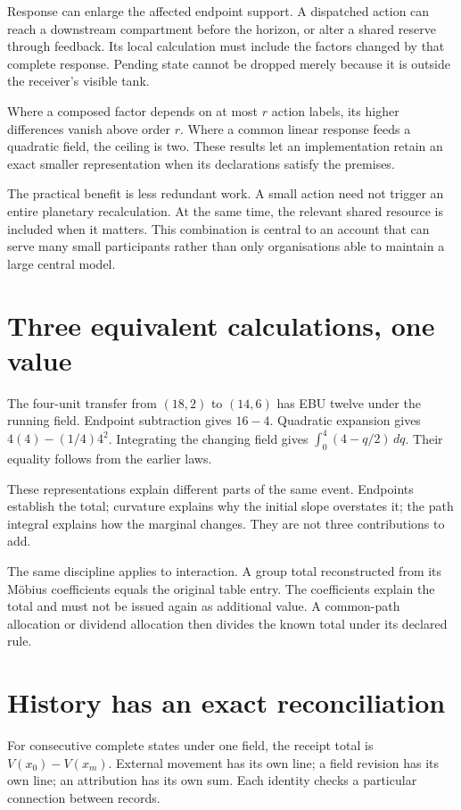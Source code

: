 Response can enlarge the affected endpoint support. A dispatched action can reach a downstream compartment before the horizon, or alter a shared reserve through feedback. Its local calculation must include the factors changed by that complete response. Pending state cannot be dropped merely because it is outside the receiver's visible tank.

Where a composed factor depends on at most $r$ action labels, its higher differences vanish above order $r$. Where a common linear response feeds a quadratic field, the ceiling is two. These results let an implementation retain an exact smaller representation when its declarations satisfy the premises.

The practical benefit is less redundant work. A small action need not trigger an entire planetary recalculation. At the same time, the relevant shared resource is included when it matters. This combination is central to an account that can serve many small participants rather than only organisations able to maintain a large central model.

\section{Three equivalent calculations, one value}
The four-unit transfer from $(18,2)$ to $(14,6)$ has EBU twelve under the running field. Endpoint subtraction gives $16-4$. Quadratic expansion gives $4(4)-(1/4)4^2$. Integrating the changing field gives $\int_0^4(4-q/2)\,dq$. Their equality follows from the earlier laws.

These representations explain different parts of the same event. Endpoints establish the total; curvature explains why the initial slope overstates it; the path integral explains how the marginal changes. They are not three contributions to add.

The same discipline applies to interaction. A group total reconstructed from its Möbius coefficients equals the original table entry. The coefficients explain the total and must not be issued again as additional value. A common-path allocation or dividend allocation then divides the known total under its declared rule.

\section{History has an exact reconciliation}
For consecutive complete states under one field, the receipt total is $V(x_0)-V(x_m)$. External movement has its own line; a field revision has its own line; an attribution has its own sum. Each identity checks a particular connection between records.

